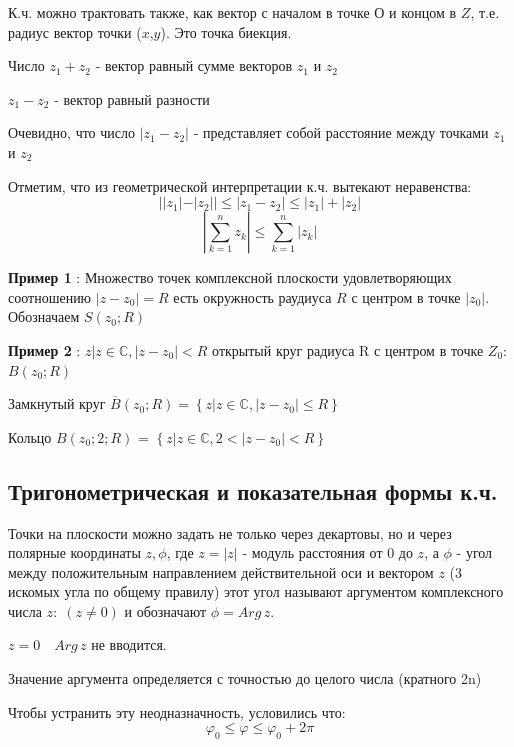\documentclass[a4paper, 12pt]{report}
\begin{document}
 К.ч. можно трактовать также, как вектор с началом в точке $О$ и концом в $Z$, т.е. радиус вектор точки ($x$,$y$). Это точка биекция.
 
 Число $z_1+z_2$ - вектор равный сумме векторов $z_1$ и $z_2$
 
 $z_1-z_2$ - вектор равный разности
 \par\bigskip
 Очевидно, что число $|z_1-z_2|$ - представляет собой расстояние между точками $z_1$ и $z_2$
 
 Отметим, что из геометрической интерпретации к.ч. вытекают неравенства:
 $$||z_1|-|z_2|| \leqslant |z_1-z_2| \leqslant |z_1|+|z_2|$$
$$\left|\sum\limits_{k=1}^n z_k\right| \leqslant \sum\limits_{k=1}^n |z_k|$$

 \par\bigskip\textbf{Пример 1} : Множество точек комплексной плоскости удовлетворяющих соотношению $|z-z_0|=R$ есть окружность раудиуса $R$ с центром в точке $|z_0|$. Обозначаем $S(z_0; R)$
    \par\bigskip
 \textbf{Пример 2} : {$z| z \in \mathbb{C}, |z-z_0| < R$} открытый круг радиуса R с центром в точке $Z_0$: $B(z_0; R)$
    \par\bigskip
 \quad Замкнутый круг $\overline{B}(z_0; R) = \left\{z| z \in \mathbb{C}, |z-z_0|\leqslant R  \right\} $
   \par\bigskip
 \quad Кольцо $B(z_0; 2; R)$ = $\left\{z| z \in \mathbb{C}, 2 < |z-z_0| < R  \right\}$
 \par\bigskip



  \subsection{Тригонометрическая и показательная формы к.ч.}  

Точки на плоскости можно задать не только через декартовы, но и через полярные координаты $z, \phi$, где $z=|z|$ - модуль расстояния от 0 до $z$, а $\phi$ - угол между положительным направлением действительной оси и вектором $z$ (3 искомых угла по общему правилу) этот угол называют аргументом комплексного числа $z:\; (z\neq 0)$ и обозначают $\phi=Arg\, z$. \par{}\quad $z=0\quad Arg\, z$ не вводится.
 \par\bigskip
 Значение аргумента определяется с точностью до целого числа  (кратного 2n)
 \par\bigskip
 Чтобы устранить эту неодназначность, условились что:
 $$\varphi_0 \leqslant \varphi \leqslant \varphi_0+2\pi$$
 
\end{document}
